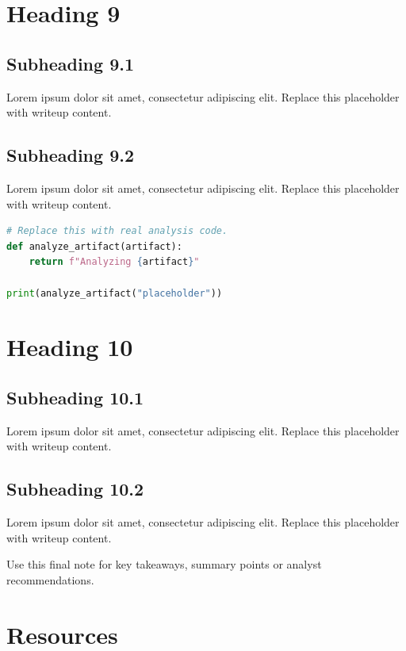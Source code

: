\documentclass[11pt,a4paper]{article}
\let\oldsection\section
\renewcommand{\section}{\clearpage\oldsection}
\newcommand{\placeholder}{\textcolor{muted}{Lorem ipsum dolor sit amet, consectetur adipiscing elit. Replace this placeholder with writeup content.}}
\begin{document}
\section{Heading 9}

\subsection{Subheading 9.1}

\placeholder

\subsection{Subheading 9.2}

\placeholder

\begin{lstlisting}[language=Python,caption={Python Example}]
# Replace this with real analysis code.
def analyze_artifact(artifact):
    return f"Analyzing {artifact}"

print(analyze_artifact("placeholder"))
\end{lstlisting}

\section{Heading 10}

\subsection{Subheading 10.1}

\placeholder

\subsection{Subheading 10.2}

\placeholder

\begin{socbox}
Use this final note for key takeaways, summary points or analyst recommendations.
\end{socbox}

\section{Resources}
\end{document}
